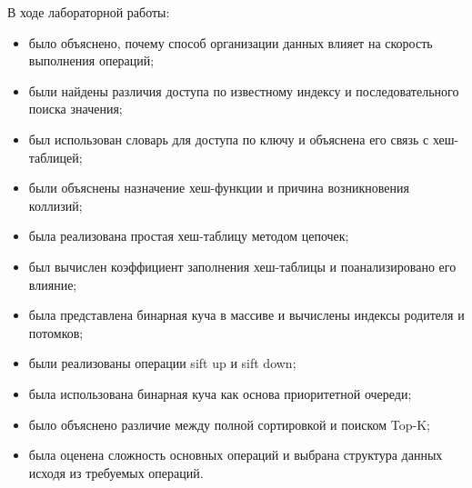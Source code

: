 




В ходе лабораторной работы:
\begin{itemize}
	\item было объяснено, почему способ организации данных влияет на скорость выполнения операций;
	\item были найдены различия доступа по известному индексу и последовательного поиска значения;
	\item был использован словарь для доступа по ключу и объяснена его связь с хеш-таблицей;
	\item были объяснены назначение хеш-функции и причина возникновения коллизий;
	\item была реализована простая хеш-таблицу методом цепочек;
	\item был вычислен коэффициент заполнения хеш-таблицы и поанализировано его влияние;
	\item была представлена бинарная куча в массиве и вычислены индексы родителя и потомков;
	\item были реализованы операции sift up и sift down;
	\item была использована бинарная куча как основа приоритетной очереди;
	\item было объяснено различие между полной сортировкой и поиском Top-K;
	\item была оценена сложность основных операций и выбрана структура данных исходя из требуемых операций.
\end{itemize}


